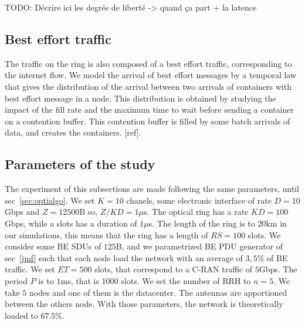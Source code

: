 \documentclass[]{algotel}
\newcommand{\todo}[1]{{\color{red} TODO: {#1}}}
\begin{document}
% 
% 

\todo{Décrire ici les degrés de liberté -> quand ça part + la latence}


\subsection{Best effort traffic}

The traffic on the ring is also composed of a best effort traffic, corresponding to the internet flow. We model the arrival of best effort messages by a temporal law that gives the distribution of the arrival between two arrivals of containers with best effort message in a node. This distribution is obtained by studying the impact of the fill rate and the maximum time to wait before sending a container on a contention buffer. This contention buffer is filled by some batch arrivals of data, and creates the containers. [ref].



  \subsection{Parameters of the study}
  \label{sec:parameters} The experiment of this subsections are made following the same parameters, until sec~\ref{sec:optialgo}. We set $K = 10$ chanels, some electronic interface of rate $D=10$Gbps and $Z = 12500$B so, $Z/KD = 1\mu$s. The optical ring has a rate $KD=100$Gbps, while a slots has a duration of $1\mu$s. The length of the ring is to $20$km in our simulations, this means that the ring has a length of $RS = 100$ slots. We consider some BE SDUs of $125$B, and we parametrized BE PDU generator of sec~\ref{jmf} such that each node load the network with an average of $3,5\%$ of BE traffic. We set $ET = 500$ slots, that correspond to a C-RAN traffic of $5$Gbps. The period  $P$ is to $1$ms, that is $1000$ slots. We set the number of RRH to $n=5$. We take $5$ nodes and one of them is the datacenter. The antennas are apportioned between the others node. With those parameters, the network is theoretically loaded to $67.5\%$. 
  
\end{document}
